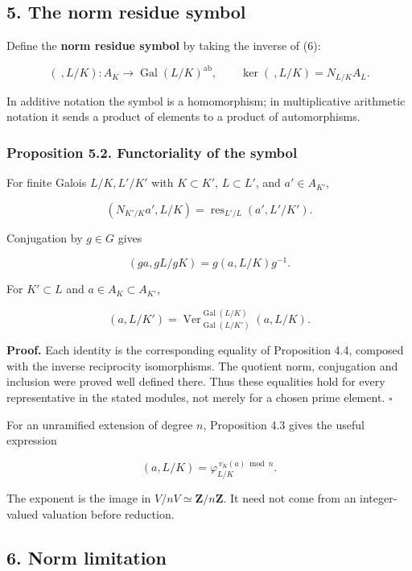 \documentclass[11pt,a4paper]{article}
\begin{document}
\subsection{5. The norm residue symbol}\label{the-norm-residue-symbol}

Define the \textbf{norm residue symbol} by taking the inverse of (6):

\[
(\ ,L/K):A_K\longrightarrow\operatorname{Gal}(L/K)^{\mathrm{ab}},
\qquad \ker(\ ,L/K)=N_{L/K}A_L.
\tag{8}
\]

In additive notation the symbol is a homomorphism; in multiplicative
arithmetic notation it sends a product of elements to a product of
automorphisms.

\subsubsection{Proposition 5.2. Functoriality of the
symbol}\label{proposition-5.2.-functoriality-of-the-symbol}

For finite Galois \(L/K,L'/K'\) with \(K\subset K'\), \(L\subset L'\),
and \(a'\in A_{K'}\),

\[
(N_{K'/K}a',L/K)
=\operatorname{res}_{L'/L}(a',L'/K').
\tag{9}
\]

Conjugation by \(g\in G\) gives

\[
(ga,gL/gK)=g(a,L/K)g^{-1}.
\tag{10}
\]

For \(K'\subset L\) and \(a\in A_K\subset A_{K'}\),

\[
(a,L/K')=\operatorname{Ver}_{\operatorname{Gal}(L/K')}^{\operatorname{Gal}(L/K)}(a,L/K).
\tag{11}
\]

\textbf{Proof.} Each identity is the corresponding equality of
Proposition 4.4, composed with the inverse reciprocity isomorphisms. The
quotient norm, conjugation and inclusion were proved well defined there.
Thus these equalities hold for every representative in the stated
modules, not merely for a chosen prime element. \(\square\)

For an unramified extension of degree \(n\), Proposition 4.3 gives the
useful expression

\[
(a,L/K)=\varphi_{L/K}^{\,v_K(a)\bmod n}.
\tag{12}
\]

The exponent is the image in \(V/nV\simeq\mathbf Z/n\mathbf Z\). It need
not come from an integer-valued valuation before reduction.

\subsection{6. Norm limitation}\label{norm-limitation}
\end{document}
